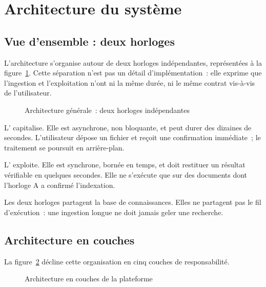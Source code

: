 \section{Architecture du système}
\label{sec:ch2-architecture}

\subsection{Vue d'ensemble : deux horloges}

L'architecture s'organise autour de deux horloges indépendantes, représentées
à la figure~\ref{fig:deux-horloges}. Cette séparation n'est pas un détail
d'implémentation~: elle exprime que l'ingestion et l'exploitation n'ont ni
la même durée, ni le même contrat vis-à-vis de l'utilisateur.

\begin{figure}[htbp]
  \centering
  \resizebox{\linewidth}{!}{}
  \caption{Architecture générale~: deux horloges indépendantes}
  \label{fig:deux-horloges}
\end{figure}

L' capitalise. Elle est asynchrone, non bloquante, et
peut durer des dizaines de secondes. L'utilisateur dépose un fichier et
reçoit une confirmation immédiate~; le traitement se poursuit en
arrière-plan.

L' exploite. Elle est synchrone, bornée en temps, et
doit restituer un résultat vérifiable en quelques secondes. Elle ne
s'exécute que sur des documents dont l'horloge A a confirmé l'indexation.

Les deux horloges partagent la base de connaissances. Elles ne partagent
pas le fil d'exécution~: une ingestion longue ne doit jamais geler une
recherche.

\subsection{Architecture en couches}

La figure~\ref{fig:architecture-couches} décline cette organisation en
cinq couches de responsabilité.

\begin{figure}[htbp]
  \centering
  \resizebox{0.92\linewidth}{!}{}
  \caption{Architecture en couches de la plateforme}
  \label{fig:architecture-couches}
\end{figure}

